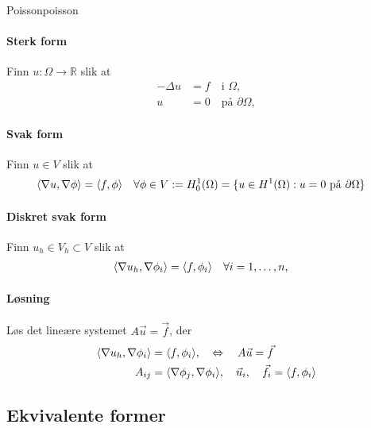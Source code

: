 \begin{example}{Poisson}{poisson}
	\paragraph{Sterk form}
	Finn $u: \Omega \to \mathbb{R}$ slik at
	\begin{align*}
		-\Delta u & = f \quad \text{i } \Omega,          \\
		u         & = 0 \quad \text{på } \partial\Omega,
	\end{align*}

	\paragraph{Svak form}
	Finn $u \in V$ slik at
	\begin{align*}
		\inner*{\nabla u, \nabla \phi} & = \inner*{f, \phi} \quad \forall \phi \in V := H^1_0(\Omega) = \{ u \in H^1(\Omega) : u = 0 \text{ på } \partial\Omega \}
	\end{align*}

	\paragraph{Diskret svak form}
	Finn $u_h \in V_h \subset V$ slik at
	\begin{align*}
		\inner*{\nabla u_h, \nabla \phi_i} & = \inner*{f, \phi_i} \quad \forall i = 1, \ldots, n,
	\end{align*}

	\paragraph{Løsning}
	Løs det lineære systemet $A\vec{u} = \vec{f}$, der
	\begin{align*}
		\inner*{\nabla u_h, \nabla \phi_i} & = \inner*{f, \phi_i},  \quad \Leftrightarrow \quad A\vec{u} = \vec{f}                          \\
		A_{ij}                             & = \inner*{\nabla \phi_j, \nabla \phi_i}, \quad \vec{u}_i, \quad \vec{f}_i = \inner*{f, \phi_i} \\
	\end{align*}

\end{example}

\subsection{Ekvivalente former}
